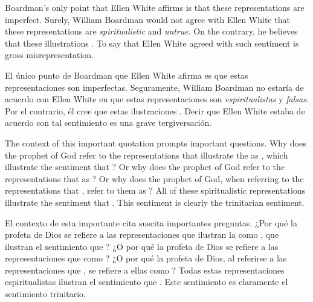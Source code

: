 Boardman’s only point that Ellen White affirms is that these representations are imperfect. Surely, William Boardman would not agree with Ellen White that these representations are \textit{spiritualistic} and \textit{untrue}. On the contrary, he believes that these illustrations . To say that Ellen White agreed with such sentiment is gross misrepresentation.


El único punto de Boardman que Ellen White afirma es que estas representaciones son imperfectas. Seguramente, William Boardman no estaría de acuerdo con Ellen White en que estas representaciones son \textit{espiritualistas} y \textit{falsas}. Por el contrario, él cree que estas ilustraciones . Decir que Ellen White estaba de acuerdo con tal sentimiento es una grave tergiversación.


The context of this important quotation prompts important questions. Why does the prophet of God refer to the representations that illustrate the  as , which illustrate the sentiment that ? Or why does the prophet of God refer to the representations that  as ? Or why does the prophet of God, when referring to the representations that , refer to them as ? All of these spiritualistic representations illustrate the sentiment that . This sentiment is clearly the trinitarian sentiment.


El contexto de esta importante cita suscita importantes preguntas. ¿Por qué la profeta de Dios se refiere a las representaciones que ilustran la  como , que ilustran el sentimiento que ? ¿O por qué la profeta de Dios se refiere a las representaciones que  como ? ¿O por qué la profeta de Dios, al referirse a las representaciones que , se refiere a ellas como ? Todas estas representaciones espiritualistas ilustran el sentimiento que . Este sentimiento es claramente el sentimiento trinitario.


